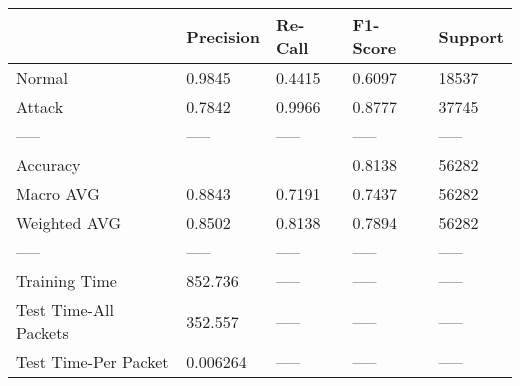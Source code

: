 \begin{tabular}{lllll}
\toprule
{} & Precision & Re-Call & F1-Score & Support \\
\midrule
Normal                &    0.9845 &  0.4415 &   0.6097 &   18537 \\
Attack                &    0.7842 &  0.9966 &   0.8777 &   37745 \\
-----                 &     ----- &   ----- &    ----- &   ----- \\
Accuracy              &           &         &   0.8138 &   56282 \\
Macro AVG             &    0.8843 &  0.7191 &   0.7437 &   56282 \\
Weighted AVG          &    0.8502 &  0.8138 &   0.7894 &   56282 \\
-----                 &     ----- &   ----- &    ----- &   ----- \\
Training Time         &   852.736 &   ----- &    ----- &   ----- \\
Test Time-All Packets &   352.557 &   ----- &    ----- &   ----- \\
Test Time-Per Packet  &  0.006264 &   ----- &    ----- &   ----- \\
\bottomrule
\end{tabular}
